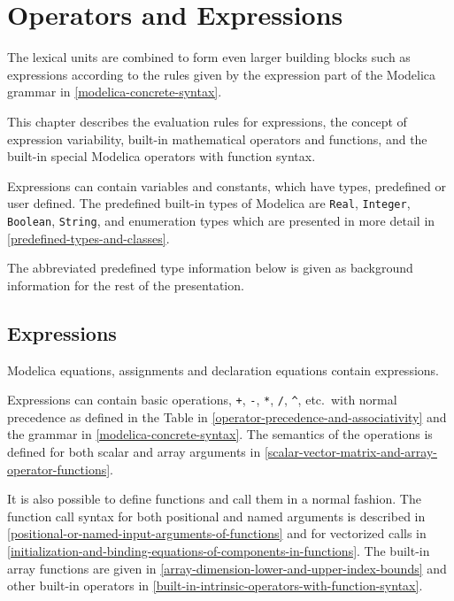 \chapter{Operators and Expressions}

The lexical units are combined to form even larger building blocks such
as expressions according to the rules given by the expression part of
the Modelica grammar in \autoref{modelica-concrete-syntax}.

This chapter describes the evaluation rules for expressions, the concept
of expression variability, built-in mathematical operators and
functions, and the built-in special Modelica operators with function
syntax.

Expressions can contain variables and constants, which have types,
predefined or user defined. The predefined built-in types of Modelica
are \lstinline!Real!, \lstinline!Integer!, \lstinline!Boolean!, \lstinline!String!, and enumeration types which are
presented in more detail in \autoref{predefined-types-and-classes}.

\begin{nonnormative}
The abbreviated predefined type information below is given as background information for the rest of the presentation.
\end{nonnormative}

\section{Expressions}

Modelica equations, assignments and declaration equations contain
expressions.

Expressions can contain basic operations, \lstinline!+!, \lstinline!-!, \lstinline!*!, \lstinline!/!, \lstinline!^!, etc.\ with
normal precedence as defined in the Table in \autoref{operator-precedence-and-associativity} and the grammar
in \autoref{modelica-concrete-syntax}. The semantics of the operations is defined for both
scalar and array arguments in \autoref{scalar-vector-matrix-and-array-operator-functions}.

It is also possible to define functions and call them in a normal
fashion. The function call syntax for both positional and named
arguments is described in \autoref{positional-or-named-input-arguments-of-functions} and for vectorized calls in
\autoref{initialization-and-binding-equations-of-components-in-functions}. The built-in array functions are given in \autoref{array-dimension-lower-and-upper-index-bounds}
and other built-in operators in \autoref{built-in-intrinsic-operators-with-function-syntax}.

